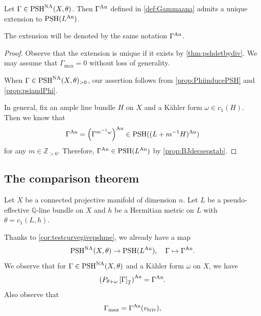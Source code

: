 \begin{corollary}\label{cor:testcurvegivepshme}
Let $\Gamma\in \mathrm{PSH}^{\mathrm{NA}}(X,\theta)$. Then $\Gamma^{\mathrm{An}}$ defined in \cref{def:Gammaana} admits a unique extension to $\mathrm{PSH}(L^{\mathrm{An}})$.
\end{corollary}
The extension will be denoted by the same notation $\Gamma^{\mathrm{An}}$.

\begin{proof}
Observe that the extension is unique if it exists by \cref{thm:pshdetbydiv}. We may assume that $\Gamma_{\max}=0$ without loss of generality.

When $\Gamma\in \mathrm{PSH}^{\mathrm{NA}}(X,\theta)_{>0}$, our assertion follows from \cref{prop:PhiinducePSH} and \cref{prop:psiandPhi}.

In general, fix an ample line bundle $H$ on $X$ and a K\"ahler form $\omega\in c_1(H)$. Then we know that
\[
\Gamma^{\mathrm{An}}=\left(\Gamma^{m^{-1}\omega}\right)^{\mathrm{An}}\in \mathrm{PSH}((L+m^{-1}H)^{\mathrm{An}})
\]
for any $m\in \mathbb{Z}_{>0}$. Therefore, $\Gamma^{\mathrm{An}}\in \mathrm{PSH}(L^{\mathrm{An}})$ by \cref{prop:BJdecseqstab}.
\end{proof}

\subsection{The comparison theorem}
\label{subsec:NA_comparison}
Let $X$ be a connected projective manifold of dimension $n$. Let $L$ be a pseudo-effective $\mathbb{Q}$-line bundle on $X$ and $h$ be a Hermitian metric on $L$ with $\theta=c_1(L,h)$.

Thanks to \cref{cor:testcurvegivepshme}, we already have a map
\begin{equation}\label{eq:analymap}
    \mathrm{PSH}^{\mathrm{NA}}(X,\theta)\rightarrow \mathrm{PSH}(L^{\mathrm{An}}),\quad \Gamma\mapsto \Gamma^{\mathrm{An}}.
\end{equation}
We observe that for $\Gamma\in \mathrm{PSH}^{\mathrm{NA}}(X,\theta)$ and a K\"ahler form $\omega$ on $X$, we have
\begin{equation}\label{eq:proj_NA_an_invariance}
\left( P_{\theta+\omega}\left[  \Gamma \right]_{\mathcal{I}} \right)^{\mathrm{An}}=\Gamma^{\mathrm{An}}.
\end{equation}
Also observe that
\begin{equation}\label{eq:Gammamax}
    \Gamma_{\max}=\Gamma^{\mathrm{An}}(v_{\mathrm{triv}}),
\end{equation}


